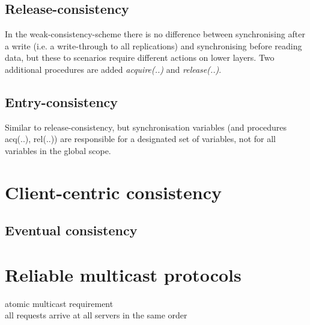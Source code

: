 \subsection{Release-consistency}
In the weak-consistency-scheme there is no difference between synchronising after a write (i.e. a write-through to all replications) and synchronising before reading data, but these to scenarios require different actions on lower layers.
Two additional procedures are added \emph{acquire(..)} and \emph{release(..)}.

\subsection{Entry-consistency}
Similar to release-consistency, but synchronisation variables (and procedures acq(..), rel(..)) are responsible for a designated set of variables, not for all variables in the global scope.

\section{Client-centric consistency}
\subsection{Eventual consistency}
\section{Reliable multicast protocols}
\begin{compactitem}
	\item atomic multicast requirement\\
	all requests arrive at all servers in the same order
\end{compactitem}
